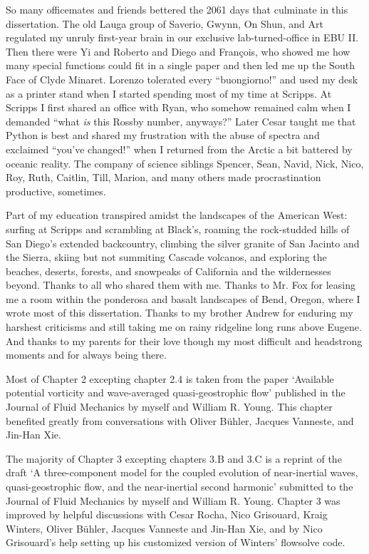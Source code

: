 \documentclass[12pt, oneside]{book}
\begin{document}
So many officemates and friends bettered the 2061 days that culminate in this dissertation.  The old Lauga group of Saverio, Gwynn, On Shun, and Art regulated my unruly first-year brain in our exclusive lab-turned-office in EBU II.  Then there were Yi and Roberto and Diego and Fran\c{c}ois, who showed me how many special functions could fit in a single paper and then led me up the South Face of Clyde Minaret.  Lorenzo tolerated every ``buongiorno!'' and used my desk as a printer stand when I started spending most of my time at Scripps.  At Scripps I first shared an office with Ryan, who somehow remained calm when I demanded ``what \textit{is} this Rossby number, anyways?''  Later Cesar taught me that Python is best and shared my frustration with the abuse of spectra and exclaimed ``you've changed!'' when I returned from the Arctic a bit battered by oceanic reality.  The company of science siblings Spencer, Sean, Navid, Nick, Nico, Roy, Ruth, Caitlin, Till, Marion, and many others made procrastination productive, sometimes. 

Part of my education transpired amidst the landscapes of the American West: surfing at Scripps and scrambling at Black's, roaming the rock-studded hills of San Diego's extended backcountry, climbing the silver granite of San Jacinto and the Sierra, skiing but not summiting Cascade volcanos, and exploring the beaches, deserts, forests, and snowpeaks of California and the wildernesses beyond.  Thanks to all who shared them with me.  Thanks to Mr. Fox for leasing me a room within the ponderosa and basalt landscapes of Bend, Oregon, where I wrote most of this dissertation.  Thanks to my brother Andrew for enduring my harshest criticisms and still taking me on rainy ridgeline long runs above Eugene.  And thanks to my parents for their love though my most difficult and headstrong moments and for always being there.

Most of Chapter 2 excepting chapter 2.4 is taken from the paper `Available potential vorticity and wave-averaged quasi-geostrophic flow' published in the Journal of Fluid Mechanics by myself and William R. Young.  This chapter benefited greatly from conversations with Oliver B\"uhler, Jacques Vanneste, and Jin-Han Xie.  

The majority of Chapter 3 excepting chapters 3.B and 3.C is a reprint of the draft `A three-component model for the coupled evolution of near-inertial waves, quasi-geostrophic flow, and the near-inertial second harmonic' submitted to the Journal of Fluid Mechanics by myself and William R. Young.  Chapter 3 was improved by helpful discussions with Cesar Rocha, Nico Grisouard, Kraig Winters, Oliver B\"uhler, Jacques Vanneste and Jin-Han Xie, and by Nico Grisouard's help setting up his customized version of Winters' flowsolve code.  
\end{document}
